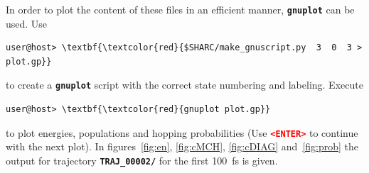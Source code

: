 \documentclass[a4paper,11pt,DIV=15,openany]{scrbook}
\newcommand{\ttt}[1]{\textbf{\texttt{#1}}}
\begin{document}
In order to plot the content of these files in an efficient manner, \ttt{gnuplot} can be used. Use
\begin{Verbatim}[commandchars=\\\{\}]
user@host> \textbf{\textcolor{red}{$SHARC/make_gnuscript.py  3  0  3 > plot.gp}}
\end{Verbatim}
to create a \ttt{gnuplot} script with the correct state numbering and labeling. Execute
\begin{Verbatim}[commandchars=\\\{\}]
user@host> \textbf{\textcolor{red}{gnuplot plot.gp}}
\end{Verbatim}
to plot energies, populations and hopping probabilities (Use \textbf{\textcolor{red}{\ttt{<ENTER>}}} to continue with the next plot). In figures~\ref{fig:en}, \ref{fig:cMCH}, \ref{fig:cDIAG} and~\ref{fig:prob} the output for trajectory \ttt{TRAJ\_00002/} for the first 100~fs is given.
\end{document}
